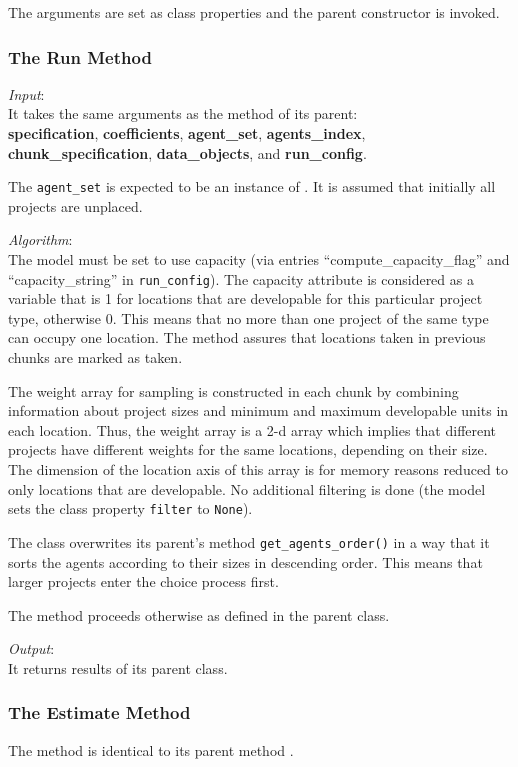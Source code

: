 The arguments are set as class properties and the parent constructor is invoked.

\subsubsection{The Run Method}
%
{\it Input}:\\[1mm]
It takes the same arguments as the  method of its parent: \\
{\bf specification}, {\bf coefficients}, {\bf agent_set}, {\bf agents_index},
{\bf chunk_specification}, {\bf data_objects}, and {\bf run_config}.

The \verb|agent_set| is expected to be an instance of
. It is assumed that initially all projects are
unplaced.

{\it Algorithm}:\\[1mm]
The model must be set to use capacity (via entries ``compute_capacity_flag''
and ``capacity_string'' in \verb|run_config|).  The capacity attribute is
considered as a variable that is 1 for locations that are developable for this
particular project type, otherwise 0. This means that no more than one project
of the same type can occupy one location. The method
 assures that locations taken in previous
chunks are marked as taken.

The weight array for sampling is constructed in each chunk by combining
information about project sizes and minimum and maximum developable units in
each location.  Thus, the weight array is a 2-d array which implies that
different projects have different weights for the same locations, depending on
their size. The dimension of the location axis of this array is for memory
reasons reduced to only locations that are developable. No additional
filtering is done (the model sets the class property \verb|filter| to
\verb|None|).

The class overwrites its parent's method \verb|get_agents_order()| in a way that it
sorts the agents according to their sizes in descending order. This means that
larger projects enter the choice process first.

The  method proceeds otherwise as defined in the parent class.

{\it Output}:~\\[1mm]
It returns results of its parent class.

\subsubsection{The Estimate Method}
%
The  method is identical to its parent method
.



